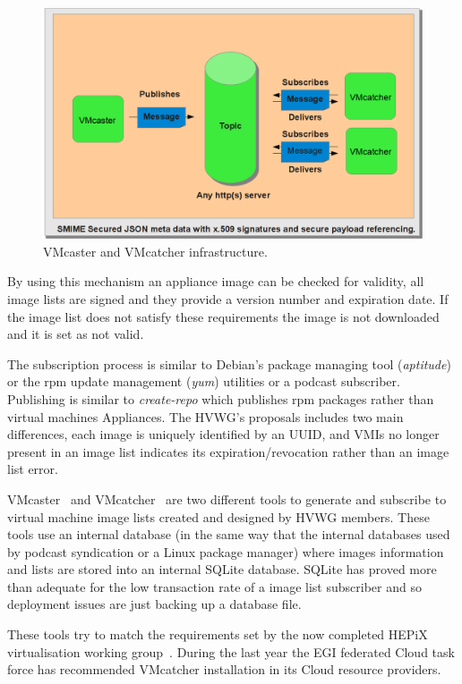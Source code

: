 \documentclass{cai}
\begin{document}
\begin{figure}
\centering
\includegraphics[width=1\textwidth]{vmcaster_vmcatcher.png}
\caption{VMcaster and VMcatcher infrastructure.}
\label{fig:infrastructure}
\end{figure}

By using this mechanism an appliance image can be checked for validity, all image lists are signed and they provide a version number and expiration date. 
If the image list does not satisfy these requirements the image is not downloaded and it is set as not valid.

The subscription process is similar to Debian's package managing tool (\textit{aptitude}) or the rpm update management (\textit{yum}) utilities or a podcast subscriber. 
Publishing is similar to \textit{create-repo} which publishes rpm packages rather than virtual machines Appliances. 
The HVWG's proposals includes two main differences, each image is uniquely identified by an UUID, and VMIs no longer present in an image list indicates its expiration/revocation rather than an image list error.


VMcaster~\cite{vmcaster} and VMcatcher~\cite{vmcatcher} are two different tools to generate and subscribe to virtual machine image lists created and designed by HVWG members.
These tools use an internal database (in the same way that the internal databases used by podcast syndication or a Linux package manager) where images information and lists are stored into an internal SQLite database.
SQLite has proved more than adequate for the low transaction rate of a image list subscriber and so deployment issues are just backing up a database file.

These tools try to match the requirements set by the now completed HEPiX virtualisation working group~\cite{hepix}.
During the last year the EGI federated Cloud task force has recommended VMcatcher installation in its Cloud resource providers.
\end{document}
